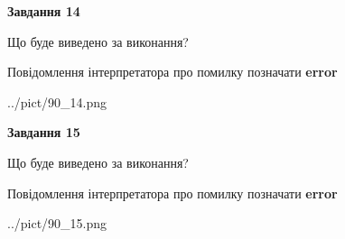 \documentclass[11pt, ukrainian]{article}
\begin{document}
{\begin {large}
{\begin {center}\textbf{Завдання 14}\end {center}}\par
Що буде виведено за виконання? \par
Повідомлення інтерпретатора про помилку позначати \textbf{error}

\begin{center}
	{../pict/90_14.png}
\end{center}
\newpage

{\begin {center}\textbf{Завдання 15}\end {center}}\par
Що буде виведено за виконання? \par
Повідомлення інтерпретатора про помилку позначати \textbf{error}

\begin{center}
	{../pict/90_15.png}
\end{center}
\newpage

\end {large}}
\end{document}
